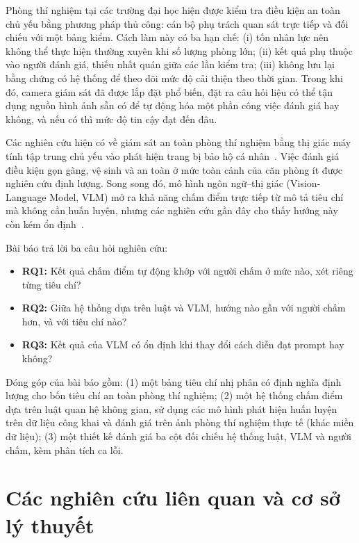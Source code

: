 \documentclass[conference]{IEEEtran}
\begin{document}
Phòng thí nghiệm tại các trường đại học hiện được kiểm tra điều kiện an toàn chủ yếu bằng phương pháp thủ công: cán bộ phụ trách quan sát trực tiếp và đối chiếu với một bảng kiểm. Cách làm này có ba hạn chế: (i) tốn nhân lực nên không thể thực hiện thường xuyên khi số lượng phòng lớn; (ii) kết quả phụ thuộc vào người đánh giá, thiếu nhất quán giữa các lần kiểm tra; (iii) không lưu lại bằng chứng có hệ thống để theo dõi mức độ cải thiện theo thời gian. Trong khi đó, camera giám sát đã được lắp đặt phổ biến, đặt ra câu hỏi liệu có thể tận dụng nguồn hình ảnh sẵn có để tự động hóa một phần công việc đánh giá hay không, và nếu có thì mức độ tin cậy đạt đến đâu.

Các nghiên cứu hiện có về giám sát an toàn phòng thí nghiệm bằng thị giác máy tính tập trung chủ yếu vào phát hiện trang bị bảo hộ cá nhân~\cite{ali2022yolov5,ppe2024safety,yolov7ppe2024}. Việc đánh giá điều kiện gọn gàng, vệ sinh và an toàn ở mức toàn cảnh của căn phòng ít được nghiên cứu định lượng. Song song đó, mô hình ngôn ngữ--thị giác (Vision-Language Model, VLM) mở ra khả năng chấm điểm trực tiếp từ mô tả tiêu chí mà không cần huấn luyện, nhưng các nghiên cứu gần đây cho thấy hướng này còn kém ổn định~\cite{goyal2026zeroshot,weng2026prompt,abdullah2025isafetybench,yarrabothula2026steelbench}.

Bài báo trả lời ba câu hỏi nghiên cứu:
\begin{itemize}
  \item \textbf{RQ1:} Kết quả chấm điểm tự động khớp với người chấm ở mức nào, xét riêng từng tiêu chí?
  \item \textbf{RQ2:} Giữa hệ thống dựa trên luật và VLM, hướng nào gần với người chấm hơn, và với tiêu chí nào?
  \item \textbf{RQ3:} Kết quả của VLM có ổn định khi thay đổi cách diễn đạt prompt hay không?
\end{itemize}

Đóng góp của bài báo gồm: (1) một bảng tiêu chí nhị phân có định nghĩa định lượng cho bốn tiêu chí an toàn phòng thí nghiệm; (2) một hệ thống chấm điểm dựa trên luật quan hệ không gian, sử dụng các mô hình phát hiện huấn luyện trên dữ liệu công khai và đánh giá trên ảnh phòng thí nghiệm thực tế (khác miền dữ liệu); (3) một thiết kế đánh giá ba cột đối chiếu hệ thống luật, VLM và người chấm, kèm phân tích ca lỗi.

\section{Các nghiên cứu liên quan và cơ sở lý thuyết}
\end{document}
